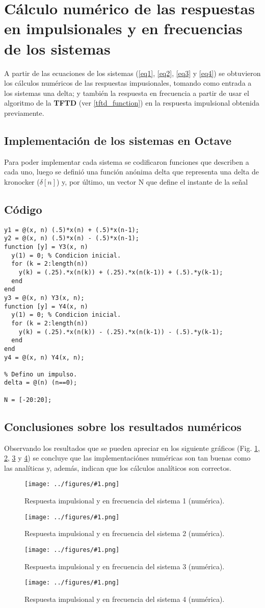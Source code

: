 \documentclass[letterpaper, 10 pt, conference]{ieeeconf}  %
\newcommand{\image}[2] {
  \begin{figure}[H]
    \centering
    \texttt{[image: ../figures/\#1.png]}
    \caption{#2}
    \label{fig:#1}
  \end{figure}
}
\begin{document}
\section{C\'alculo num\'erico de las respuestas en impulsionales y en frecuencias de los sistemas}
A partir de las ecuaciones de los sistemas (\ref{eq1}, \ref{eq2}, \ref{eq3} y \ref{eq4}) se obtuvieron los c\'alculos num\'ericos de las respuestas impusionales, tomando como entrada a los sistemas una delta; y tambi\'en la respuesta en frecuencia a partir de usar el algoritmo de la \textbf{TFTD} (ver \ref{tftd_function}) en la respuesta impulsional obtenida previamente.

\subsection{Implementaci\'on de los sistemas en Octave}
Para poder implementar cada sistema se codificaron funciones que describen a cada uno, luego se defini\'o una funci\'on an\'onima delta que representa una delta de kronocker ($\delta[n]$) y, por \'ultimo, un vector N que define el instante de la señal

\subsection{C\'odigo}
\begin{lstlisting}[style=Matlab-editor]
y1 = @(x, n) (.5)*x(n) + (.5)*x(n-1);
y2 = @(x, n) (.5)*x(n) - (.5)*x(n-1);
function [y] = Y3(x, n)
  y(1) = 0; % Condicion inicial.
  for (k = 2:length(n))
    y(k) = (.25).*x(n(k)) + (.25).*x(n(k-1)) + (.5).*y(k-1);
  end
end
y3 = @(x, n) Y3(x, n);
function [y] = Y4(x, n)
  y(1) = 0; % Condicion inicial.
  for (k = 2:length(n))
    y(k) = (.25).*x(n(k)) - (.25).*x(n(k-1)) - (.5).*y(k-1);
  end
end
y4 = @(x, n) Y4(x, n);

% Defino un impulso.
delta = @(n) (n==0);

N = [-20:20];

\end{lstlisting}

\subsection{Conclusiones sobre los resultados num\'ericos}
Observando los resultados que se pueden apreciar en los siguiente gr\'aficos (Fig. \ref{fig:num_resp_sist_1}, \ref{fig:num_resp_sist_2}, \ref{fig:num_resp_sist_3} y \ref{fig:num_resp_sist_4}) se concluye que las implementaci\'ones num\'ericas son tan buenas como las anal\'iticas y, adem\'as, indican que los c\'alculos anal\'iticos son correctos.
\image{num_resp_sist_1}{Respuesta impulsional y en frecuencia del sistema 1 (num\'erica).}
\image{num_resp_sist_2}{Respuesta impulsional y en frecuencia del sistema 2 (num\'erica).}
\image{num_resp_sist_3}{Respuesta impulsional y en frecuencia del sistema 3 (num\'erica).}
\image{num_resp_sist_4}{Respuesta impulsional y en frecuencia del sistema 4 (num\'erica).}
\end{document}
